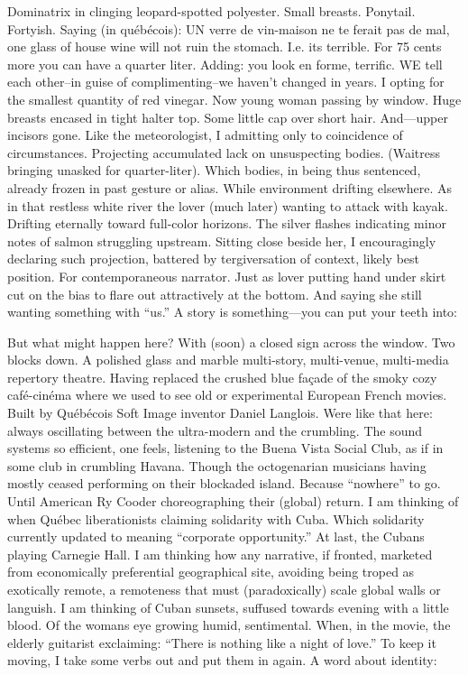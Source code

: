 \documentclass[
]{memoir}
\begin{document}
Dominatrix in clinging leopard-spotted polyester. Small breasts.
Ponytail. Fortyish. Saying (in québécois): UN verre de vin-maison ne te
ferait pas de mal, one glass of house wine will not ruin the stomach.
I.e. its terrible. For 75 cents more you can have a quarter liter.
Adding: you look en forme, terrific. WE tell each other--in guise of
complimenting--we haven't changed in years. I opting for the smallest
quantity of red vinegar. Now young woman passing by window. Huge breasts
encased in tight halter top. Some little cap over short hair.
And---upper incisors gone. Like the meteorologist, I admitting only to
coincidence of circumstances. Projecting accumulated lack on
unsuspecting bodies. (Waitress bringing unasked for quarter-liter).
Which bodies, in being thus sentenced, already frozen in past gesture or
alias. While environment drifting elsewhere. As in that restless white
river the lover (much later) wanting to attack with kayak. Drifting
eternally toward full-color horizons. The silver flashes indicating
minor notes of salmon struggling upstream. Sitting close beside her, I
encouragingly declaring such projection, battered by tergiversation of
context, likely best position. For contemporaneous narrator. Just as
lover putting hand under skirt cut on the bias to flare out attractively
at the bottom. And saying she still wanting something with ``us.'' A
story is something---you can put your teeth into:

But what might happen here? With (soon) a closed sign across the window.
Two blocks down. A polished glass and marble multi-story, multi-venue,
multi-media repertory theatre. Having replaced the crushed blue façade
of the smoky cozy café-cinéma where we used to see old or experimental
European French movies. Built by Québécois Soft Image inventor Daniel
Langlois. Were like that here: always oscillating between the
ultra-modern and the crumbling. The sound systems so efficient, one
feels, listening to the Buena Vista Social Club, as if in some club in
crumbling Havana. Though the octogenarian musicians having mostly ceased
performing on their blockaded island. Because ``nowhere'' to go. Until
American Ry Cooder choreographing their (global) return. I am thinking
of when Québec liberationists claiming solidarity with Cuba. Which
solidarity currently updated to meaning ``corporate opportunity.'' At
last, the Cubans playing Carnegie Hall. I am thinking how any narrative,
if fronted, marketed from economically preferential geographical site,
avoiding being troped as exotically remote, a remoteness that must
(paradoxically) scale global walls or languish. I am thinking of Cuban
sunsets, suffused towards evening with a little blood. Of the womans eye
growing humid, sentimental. When, in the movie, the elderly guitarist
exclaiming: ``There is nothing like a night of love.'' To keep it
moving, I take some verbs out and put them in again. A word about
identity:
\end{document}
